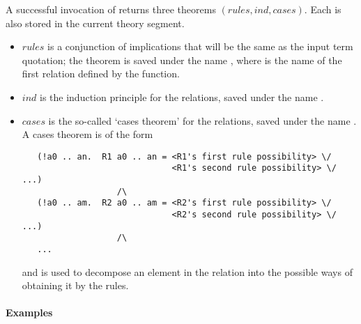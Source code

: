 A successful invocation of  returns three theorems
$(\mathit{rules},\mathit{ind},\mathit{cases})$. Each is also stored in
the current theory segment.
\begin{itemize}
\item $\mathit{rules}$ is a conjunction of implications
that will be the same as the input term quotation; the theorem is
saved under the name , where  is the name of the
first relation defined by the function.  
\item $\mathit{ind}$ is the induction principle for the relations, 
saved under the name .  
\item $\mathit{cases}$ is the so-called `cases theorem' for the relations, 
saved under the name . A cases theorem is of the form
%
\begin{hol}
\begin{verbatim}
   (!a0 .. an.  R1 a0 .. an = <R1's first rule possibility> \/
                              <R1's second rule possibility> \/ ...)
                   /\
   (!a0 .. am.  R2 a0 .. am = <R2's first rule possibility> \/
                              <R2's second rule possibility> \/ ...)
                   /\
   ...
\end{verbatim}
\end{hol}
%
and is used to decompose an element in the relation into the 
possible ways of obtaining it by the rules.
\end{itemize}

\paragraph{Examples}

